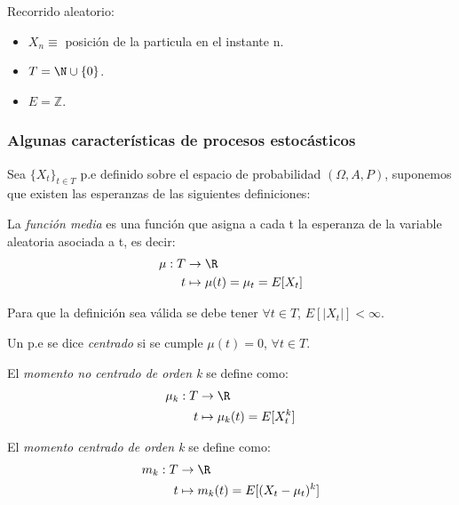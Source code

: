 \begin{ejemplo}
  Recorrido aleatorio:
  \begin{itemize}
    \item $X_n \equiv$ posición de la particula en el instante n.
    \item $T = \N \cup \{0\}$.
    \item $E = \mathbb{Z}$.
  \end{itemize}
\end{ejemplo}

\subsubsection{Algunas características de procesos estocásticos}

Sea $\{X_t\}_{t \in T}$ p.e definido sobre el espacio de probabilidad $(\Omega, A, P)$, suponemos que existen las esperanzas de las siguientes definiciones:

\begin{ndef}
  La \emph{función media} es una función que asigna a cada t la esperanza de la variable aleatoria asociada a t, es decir:
  \begin{align*}
    \mu: T & \to \R \\
    t & \mapsto \mu(t) = \mu_t = E[X_t]
  \end{align*}
\end{ndef}

\begin{nota}
  Para que la definición sea válida se debe tener $\forall t \in T$, $E[|X_t|] < \infty$.
\end{nota}

\begin{ndef}
  Un p.e se dice \emph{centrado} si se cumple $\mu(t) = 0$, $\forall t \in T$.
\end{ndef}

\begin{ndef}
  El \emph{momento no centrado de orden k} se define como:
  \begin{align*}
    \mu_k : T & \to \R \\
    t & \mapsto \mu_k(t) = E[X^k_t]
  \end{align*}
\end{ndef}

\begin{ndef}
  El \emph{momento centrado de orden k} se define como:
  \begin{align*}
    m_k : T & \to \R \\
    t & \mapsto m_k(t) = E[(X_t - \mu_t)^k]
  \end{align*}
\end{ndef}

